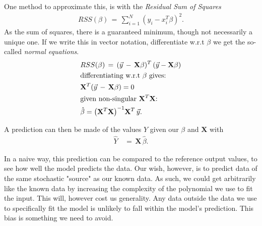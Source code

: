 \documentclass[ 12pt, a4paper ]{article}
\begin{document}
One method to approximate this, is with the \textit{Residual Sum of Squares}
\begin{align}
    RSS(\beta) \,=\, \sum_{i=1}^N (y_i - x_i^T\beta)^2.
\end{align}
As the sum of squares, there is a guaranteed minimum, though not necessarily a unique one. 
If we write this in vector notation, differentiate w.r.t $\beta$ we get the so-called 
\textit{normal equations}. 
\begin{align}
    &RSS(\beta) \,=\, ( \vec{y} \,-\, \mathbf{X}\beta )^T \, ( \vec{y} - \mathbf{X}\beta )
    \nonumber \\
    &\text{differentiating w.r.t $\beta$ gives:} \nonumber \\
    &    \mathbf{X}^T(\vec{y} \,-\, \mathbf{X}\beta) = 0 \nonumber \\
    &\text{given non-singular $\mathbf{X}^T\mathbf{X}$:} \nonumber \\
    & \hat{\beta} = \qty(\mathbf{X}^T\mathbf{X})^{-1}\mathbf{X}^T\,\vec{y}.
    \label{eq:minbeta}
\end{align}

A prediction can then be made of the values $Y$ given our $\beta$ and $\mathbf{X}$ with
\begin{align}
    \hat{Y} \,&=\, \mathbf{X}\,\hat{\beta}.
\end{align}

In a naive way, this prediction can be compared to the reference output values, to see how
well the model predicts the data. Our wish, however, is to predict data of the same stochastic
"source" as our known data. As such, we could get arbitrarily like the known data by 
increasing the complexity of the polynomial we use to fit the input. This will, however cost us
generality. Any data outside the data we use to specifically fit the model is unlikely to fall 
within the model's prediction. This bias is something we need to avoid.\\
\end{document}
